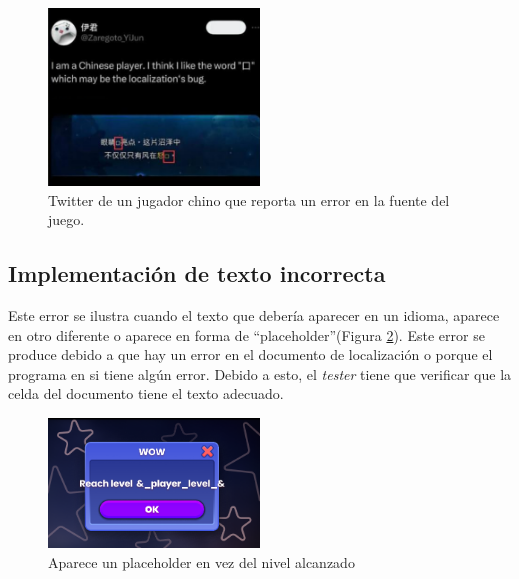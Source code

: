 \begin{figure}[H]
	\centering
	\includegraphics[width = 0.5\textwidth]{Imagenes/Errores_Localizacion/E_Font.png}
	\caption{Twitter de un jugador chino que reporta un error en la fuente del juego.}
	\label{fig:EFont}
\end{figure}

\subsection{Implementación de texto incorrecta}\label{ErrorImpIncorrecta}
Este error se ilustra cuando el texto que debería aparecer en un idioma, aparece en otro diferente o aparece en forma de ``placeholder''(Figura \ref{fig:E_Implementacion}). Este error se produce debido a que hay un error en el documento de localización o porque el programa en si tiene algún error. Debido a esto, el \textit{tester} tiene que verificar que la celda del documento tiene el
texto adecuado.
\begin{figure}[H]
	\centering
	\includegraphics[width = 0.5\textwidth]{Imagenes/Errores_Localizacion/E_Implementacion.png}
	\caption{Aparece un placeholder en vez del nivel alcanzado}
	\label{fig:E_Implementacion}
\end{figure}
